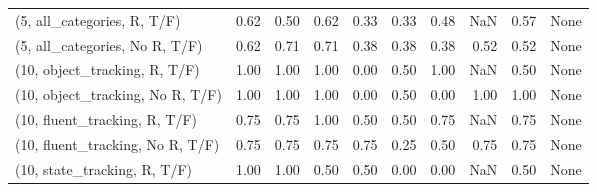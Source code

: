 \begin{table*}[h!]
\begin{adjustbox}{width=2\columnwidth,center}
\begin{tabular}{lrrr|rrr|rrr}
(5, all\_categories, R, T/F)          &                      0.62 &                  0.50 &                      0.62 &                          0.33 &                      0.33 &                          0.48 &                                    NaN &                               0.57 &                                  None \\
(5, all\_categories, No R, T/F)       &                      0.62 &                  0.71 &                      0.71 &                          0.38 &                      0.38 &                          0.38 &                                   0.52 &                               0.52 &                                  None \\



\midrule
(10, object\_tracking, R, T/F)         &                      1.00 &                  1.00 &                      1.00 &                          0.00 &                      0.50 &                          1.00 &                                    NaN &                               0.50 &                                  None \\
(10, object\_tracking, No R, T/F)      &                      1.00 &                  1.00 &                      1.00 &                          0.00 &                      0.50 &                          0.00 &                                   1.00 &                               1.00 &                                  None \\
(10, fluent\_tracking, R, T/F)         &                      0.75 &                  0.75 &                      1.00 &                          0.50 &                      0.50 &                          0.75 &                                    NaN &                               0.75 &                                  None \\
(10, fluent\_tracking, No R, T/F)      &                      0.75 &                  0.75 &                      0.75 &                          0.75 &                      0.25 &                          0.50 &                                   0.75 &                               0.75 &                                  None \\
(10, state\_tracking, R, T/F)          &                      1.00 &                  1.00 &                      0.50 &                          0.50 &                      0.00 &                          0.00 &                                    NaN &                               0.50 &                                  None \\

\end{tabular}
\end{adjustbox}
\end{table*}

